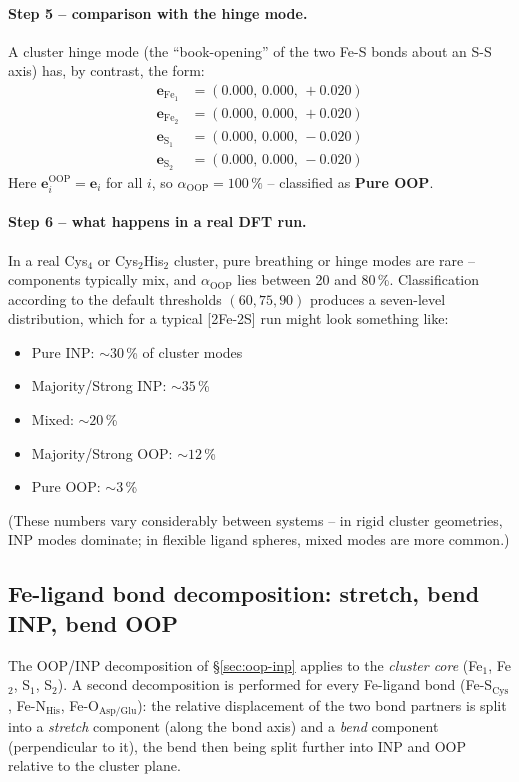 \documentclass[11pt,a4paper,twoside]{article}
\newcommand{\OOP}{\mathrm{OOP}}
\theoremstyle{remark}
\begin{document}
\paragraph{Step 5 -- comparison with the hinge mode.}
A cluster hinge mode (the ``book-opening'' of the two Fe-S bonds
about an S-S axis) has, by contrast, the form:
\begin{align*}
  \mathbf{e}_{\text{Fe}_1} &= (0.000,\, 0.000,\, +0.020) \\
  \mathbf{e}_{\text{Fe}_2} &= (0.000,\, 0.000,\, +0.020) \\
  \mathbf{e}_{\text{S}_1}  &= (0.000,\, 0.000,\, -0.020) \\
  \mathbf{e}_{\text{S}_2}  &= (0.000,\, 0.000,\, -0.020)
\end{align*}
Here $\mathbf{e}_i^\text{OOP} = \mathbf{e}_i$ for all $i$,
so $\alpha_{\OOP} = 100\,\%$ -- classified as \textbf{Pure OOP}.

\paragraph{Step 6 -- what happens in a real DFT run.}
In a real Cys$_4$ or Cys$_2$His$_2$ cluster, pure breathing or
hinge modes are rare -- components typically mix, and
$\alpha_{\OOP}$ lies between 20 and 80\,\%. Classification
according to the default thresholds $(60, 75, 90)$ produces a
seven-level distribution, which for a typical [2Fe-2S] run
might look something like:
\begin{itemize}\setlength{\itemsep}{0pt}
  \item Pure INP: $\sim 30$\,\% of cluster modes
  \item Majority/Strong INP: $\sim 35$\,\%
  \item Mixed: $\sim 20$\,\%
  \item Majority/Strong OOP: $\sim 12$\,\%
  \item Pure OOP: $\sim 3$\,\%
\end{itemize}
(These numbers vary considerably between systems -- in rigid
cluster geometries, INP modes dominate; in flexible ligand spheres,
mixed modes are more common.)

\subsection{Fe-ligand bond decomposition: stretch, bend INP, bend OOP}
\label{sec:fe-lig-decomp}

The OOP/INP decomposition of \S\ref{sec:oop-inp} applies to the
\emph{cluster core} (Fe$_1$, Fe$_2$, S$_1$, S$_2$). A second
decomposition is performed for every Fe-ligand bond
(Fe-S$_\text{Cys}$, Fe-N$_\text{His}$, Fe-O$_\text{Asp/Glu}$): the
relative displacement of the two bond partners is split into a
\emph{stretch} component (along the bond axis) and a
\emph{bend} component (perpendicular to it), the bend then being
split further into INP and OOP relative to the cluster plane.
\end{document}
